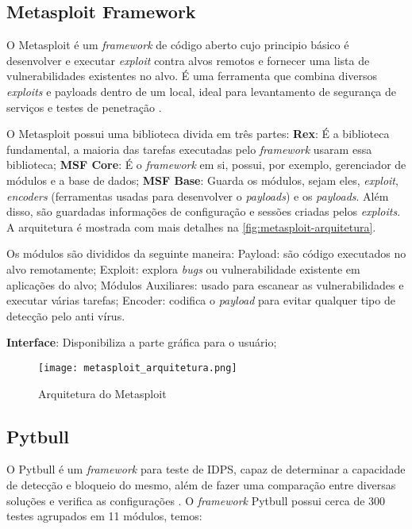  \subsection{Metasploit Framework} \label{sec:metasploit}

 O Metasploit é um \textit{framework} de código aberto cujo principio básico é desenvolver e executar \textit{exploit} contra alvos remotos e fornecer uma lista de vulnerabilidades existentes no alvo. É uma ferramenta que combina diversos \textit{exploits} e payloads dentro de um local, ideal para levantamento de segurança de serviços e testes de penetração \cite{metasploit:yash}.  

 O Metasploit possui uma biblioteca divida em três partes: \textbf{Rex}: É a biblioteca fundamental, a maioria das tarefas executadas pelo \textit{framework} usaram essa biblioteca; \textbf{MSF Core}: É o \textit{framework} em si, possui, por exemplo, gerenciador de módulos e a base de dados; \textbf{MSF Base}: Guarda os módulos, sejam eles, \textit{exploit}, \textit{encoders} (ferramentas usadas para desenvolver o \textit{payloads}) e os \textit{payloads}. Além disso, são guardadas informações de configuração e sessões criadas pelos \textit{exploits}. A arquitetura é mostrada com mais detalhes na \autoref{fig:metasploit-arquitetura}. 

 Os módulos são divididos da seguinte maneira: Payload: são código executados no alvo remotamente; Exploit: explora \textit{bugs} ou vulnerabilidade existente em aplicações do alvo; Módulos Auxiliares: usado para escanear as vulnerabilidades e executar várias tarefas; Encoder: codifica o \textit{payload} para evitar qualquer tipo de detecção pelo anti vírus.

 \textbf{Interface}: Disponibiliza a parte gráfica para o usuário;

 \begin{figure}[!htb]
  \centering
  \caption{Arquitetura do Metasploit}
  \texttt{[image: metasploit\_arquitetura.png]}
  \legend{}
  \label{fig:metasploit-arquitetura}
 \end{figure}

 \subsection{Pytbull} \label{sec:pytbull}

 O Pytbull é um \textit{framework} para teste de IDPS, capaz de determinar a capacidade de detecção e bloqueio do mesmo, além de fazer uma comparação entre diversas soluções e verifica as configurações \cite{pytbull}. O \textit{framework} Pytbull possui cerca de 300 testes agrupados em 11 módulos, temos:

